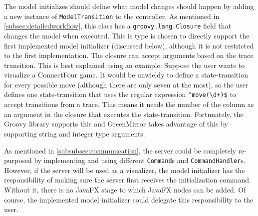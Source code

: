 \documentclass[a4paper]{article}
\begin{document}
	The model initializes should define what model changes should happen by adding a new instance of \lstinline{ModelTransition} to the controller. As mentioned in \cref{subsec:detailedworkflow}, this class has a \lstinline{groovy.lang.Closure} field that changes the model when executed. This is type is chosen to directly support the first implemented model initializer (discussed below), although it is not restricted to the first implementation. The closure can accept arguments based on the trace transition. This is best explained using an example. Suppose the user wants to visualize a ConnectFour game. It would be unwieldy to define a state-transition for every possible move (although there are only seven at the most), so the user defines one state-transition that uses the regular expression \lstinline{^move(\d+)$} to accept transitions from a trace. This means it needs the number of the column as an argument in the closure that executes the state-transition. Fortunately, the Groovy library supports this and GreenMirror takes advantage of this by supporting string and integer type arguments.
	
	As mentioned in \cref{subsubsec:communication}, the server could be completely re-purposed by implementing and using different \lstinline{Command}s and \lstinline{CommandHandler}s. However, if the server will be used as a visualizer, the model initializer has the responsibility of making sure the server first receives the initialization command. Without it, there is no JavaFX stage to which JavaFX nodes can be added. Of course, the implemented model initializer could delegate this responsibility to the user.
	
\end{document}
